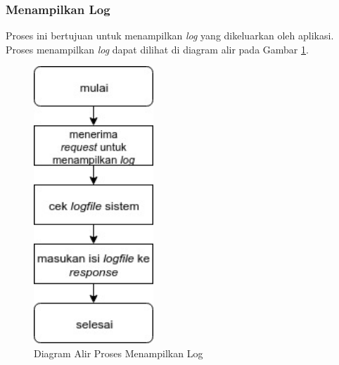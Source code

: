 \subsubsection{Menampilkan Log}
\par Proses ini bertujuan untuk menampilkan \textit{log} yang dikeluarkan oleh aplikasi. Proses menampilkan \textit{log} dapat dilihat di diagram alir pada Gambar \ref{fc:log}.
\begin{figure}[H]
	\centering\includegraphics[width=0.4\textwidth]{bab3/img/flowchart-menampilkan_log.jpg}
	\caption{Diagram Alir Proses Menampilkan Log} \label{fc:log}
\end{figure}
\clearpage

